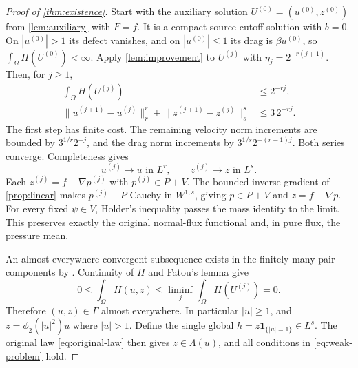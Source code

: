 \documentclass[11pt]{article}
\theoremstyle{remark}
\newcommand{\ind}{\mathbf 1}
\newcommand{\norm}[2]{\lVert #1\rVert_{#2}}
\begin{document}
\begin{proof}[Proof of \cref{thm:existence}]
Start with the auxiliary solution $U^{(0)}=(u^{(0)},z^{(0)})$ from
\cref{lem:auxiliary} with $F=f$. It is a compact-source cutoff
solution with $b=0$. On $|u^{(0)}|>1$ its defect vanishes, and on
$|u^{(0)}|\le1$ its drag is $\beta u^{(0)}$, so
$\int_\Omega H(U^{(0)})<\infty$.
Apply \cref{lem:improvement} to $U^{(j)}$ with
$\eta_j=2^{-r(j+1)}$. Then, for $j\ge1$,
\begin{align*}
 \int_\Omega H(U^{(j)})&\le2^{-rj},\\
 \norm{u^{(j+1)}-u^{(j)}}{r}^r
  +\norm{z^{(j+1)}-z^{(j)}}{s}^s&\le3\,2^{-rj}.
\end{align*}
The first step has finite cost. The remaining velocity norm increments
are bounded by $3^{1/r}2^{-j}$, and the drag norm increments by
$3^{1/s}2^{-(r-1)j}$. Both series converge. Completeness gives
\[
 u^{(j)}\longrightarrow u\text{ in }L^r,\qquad
 z^{(j)}\longrightarrow z\text{ in }L^s.
\]
Each $z^{(j)}=f-\nabla p^{(j)}$ with $p^{(j)}\in P+V$.
The bounded inverse gradient of \cref{prop:linear} makes
$p^{(j)}-P$ Cauchy in $W^{1,s}$, giving $p\in P+V$ and
$z=f-\nabla p$. For every fixed $\psi\in V$, Holder's inequality
passes the mass identity to the limit. This preserves exactly the
original normal-flux functional and, in pure flux, the pressure mean.

An almost-everywhere convergent subsequence exists in the finitely
many pair components by \cite[Theorem 4.9]{Brezis}. Continuity of
$H$ and Fatou's lemma give
\[
 0\le\int_\Omega H(u,z)
 \le\liminf_j\int_\Omega H(U^{(j)})=0.
\]
Therefore $(u,z)\in\Gamma$ almost everywhere. In particular $|u|\ge1$,
and $z=\phi_2(|u|^2)u$ where $|u|>1$. Define the single global
$h=z\ind_{\{|u|=1\}}\in L^s$. The original law
\eqref{eq:original-law} then gives $z\in\Lambda(u)$, and all
conditions in \eqref{eq:weak-problem} hold.
\end{proof}
\end{document}
